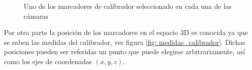 \begin{figure}[H]
      
      \caption{Uno de los marcadores de calibrador seleccionado en cada una de las cámaras}
      \label{fig: vistas_calibrador}
      
\end{figure}


Por otra parte la posición de los marcadores en el espacio 3D es conocida ya que se saben las medidas del calibrador, ver figura \ref{fig: medidas_calibrador}. Dichas posiciones pueden ser referidas un punto que puede elegirse arbitrariamente, así como los ejes de coordenadas $(x,y,z)$.

